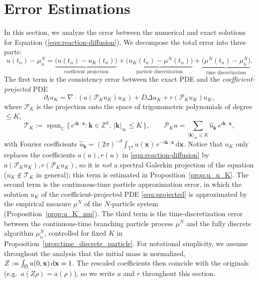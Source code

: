 \documentclass[a4paper,fleqn]{cas-sc}
\newcommand{\mhyphen}{\text{-}}
\theoremstyle{definition}
\theoremstyle{remark}
\begin{document}
\section{Error Estimations}
In this section, we analyze the error between the numerical and exact solutions for Equation (\ref{equ:reaction-diffusion}). 
We decompose the total error into three parts:
\begin{equation}\label{eq:err-decomp}
u(t_n)-\mu_n^N
=\underbrace{\bigl(u(t_n)-u_K(t_n)\bigr)}_{\text{coefficient projection}}
+\underbrace{\bigl(u_K(t_n)-\mu^N(t_n)\bigr)}_{\text{particle discretization}}
+\underbrace{\bigl(\mu^N(t_n)-\mu_n^N\bigr)}_{\text{time discretization}}.
\end{equation}
The first term is the consistency error between the exact PDE and the
\emph{coefficient-projected} PDE
\begin{equation}\label{equ:projected}
    \partial_t u_K  = \nabla \cdot \left( a (\mathcal P_K u_K) u_K\right) + D \Delta u_K  + r\left(\mathcal P_K u_K\right)  u_K,
\end{equation}
where $\mathcal P_K$ is the projection onto the space of trigonometric
polynomials of degree $\le K$,
\[
  \mathcal T_K
  := \operatorname{span}_{\mathbb C}
     \bigl\{\, e^{i\mathbf k\cdot\mathbf x} : \mathbf k\in\mathbb Z^d,\ |\mathbf k|_\infty\le K \,\bigr\},
  \qquad
  \mathcal P_K u = \sum_{|\mathbf k|_\infty\le K}\hat u_{\mathbf k}\,e^{i\mathbf k\cdot\mathbf x},
\]
with Fourier coefficients
$\hat u_{\mathbf k}=(2\pi)^{-d}\int_{\mathbb T^d}u(\mathbf x)\,e^{-i\mathbf k\cdot\mathbf x}\,\mathrm d\mathbf x$.
Notice that $u_K$ only replaces the coefficients $a(u),r(u)$ in
\eqref{equ:reaction-diffusion} by $a(\mathcal P_K u_K),r(\mathcal P_K u_K)$, so it
is \emph{not} a spectral Galerkin projection of the equation
($u_K\notin\mathcal T_K$ in general); this term is estimated in
Proposition~\ref{prop:u_u_K}.
The second term is the continuous-time particle approximation error, in which the
solution $u_K$ of the coefficient-projected PDE \eqref{equ:projected} is
approximated by the empirical measure $\mu^N$ of the $N\mhyphen$particle system
(Proposition~\ref{prop:u_K_mu}).
The third term is the time-discretization error between the continuous-time
branching particle process $\mu^N$ and the fully discrete algorithm $\mu^N_n$,
controlled for fixed $K$ in Proposition~\ref{prop:time_discrete_particle}.
For notational simplicity, we assume throughout the analysis that the initial
mass is normalized, $Z:=\int_\Omega u(0,\mathbf{x})\,\mathrm{d}\mathbf{x}=1$. The rescaled
coefficients then coincide with the originals (e.g.\ $a(Z\rho)=a(\rho)$), so we
write $a$ and $r$ throughout this section.
\end{document}

